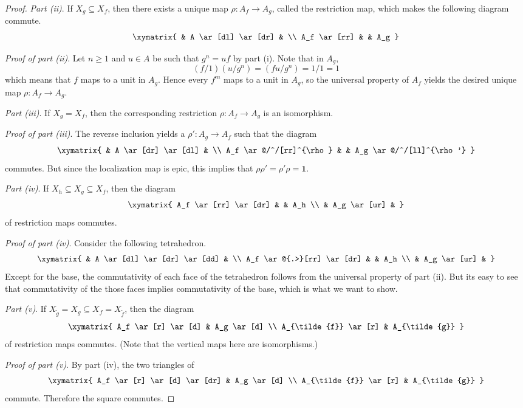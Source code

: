 \begin{definition}
\begin{proof}
\emph{Part (ii)}. If $ X_g \subseteq X_f$, then there exists a unique map $ \rho : A_f \to A_g$, called the restriction map, which makes the following diagram commute.
\[ \xymatrix{ & A \ar[dl] \ar[dr] & \\ A_f \ar[rr] & & A_g } \]

\emph{Proof of part (ii)}. 
Let $ n \geq 1$ and $ u \in A$ be such that $ g^n = uf$ by part (i). Note that in $ A_g$,
\[ (f/1)(u/g^n) = (fu/g^n) = 1/1 = 1 \]
which means that $ f$ maps to a unit in $ A_g$. Hence every $ f^m$ maps to a unit in $ A_g$, so the universal property of $ A_f$ yields the desired unique map $ \rho : A_f \to A_g$.

\emph{Part (iii)}. 
If $ X_g = X_f$, then the corresponding restriction $ \rho : A_f \to A_g$ is an isomorphism.

\emph{Proof of part (iii)}. 
The reverse inclusion yields a $ \rho' : A_g \to A_f$ such that the diagram
\[ \xymatrix{
& A \ar[dr] \ar[dl] & \\
A_f \ar@/^/[rr]^{\rho} & & A_g \ar@/^/[ll]^{\rho'}
} \]
commutes. But since the localization map is epic, this implies that $ \rho \rho' = \rho' \rho = \mathbf{1}$.

\emph{Part (iv)}.
If $ X_h \subseteq X_g \subseteq X_f$, then the diagram
\[ \xymatrix{
A_f \ar[rr] \ar[dr] & & A_h \\
& A_g \ar[ur] &
} \]
of restriction maps commutes.

\emph{Proof of part (iv)}.
Consider the following tetrahedron.
\[ \xymatrix{
& A \ar[dl] \ar[dr] \ar[dd] & \\
A_f \ar@{.>}[rr] \ar[dr] & & A_h \\
& A_g \ar[ur] &
} \]
Except for the base, the commutativity of each face of the tetrahedron follows from the universal property of part (ii). But its easy to see that commutativity of the those faces implies commutativity of the base, which is what we want to show.

\emph{Part (v)}.
If $ X_{\tilde{g}} = X_g \subseteq X_f = X_{\tilde{f}}$, then the diagram
\[ \xymatrix{
A_f \ar[r] \ar[d] & A_g \ar[d] \\
A_{\tilde{f}} \ar[r] & A_{\tilde{g}}
} \]
of restriction maps commutes. (Note that the vertical maps here are isomorphisms.)

\emph{Proof of part (v)}.
By part (iv), the two triangles of
\[ \xymatrix{
A_f \ar[r] \ar[d] \ar[dr] & A_g \ar[d] \\
A_{\tilde{f}} \ar[r] & A_{\tilde{g}}
} \]
commute. Therefore the square commutes.


\end{proof}
\end{definition}
